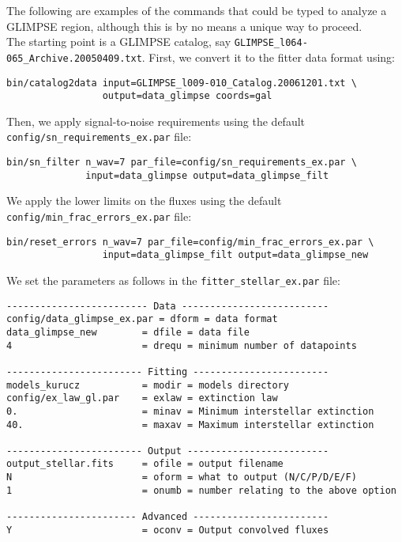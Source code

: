 \documentclass[letterpaper,11pt]{report}
\begin{document}
The following are examples of the commands that could be typed to analyze a GLIMPSE region, although this is by no means a unique way to proceed.\\

The starting point is a GLIMPSE catalog, say \texttt{GLIMPSE\_l064-065\_Archive.20050409.txt}. First, we convert it to the fitter data format using:

\begin{verbatim}
bin/catalog2data input=GLIMPSE_l009-010_Catalog.20061201.txt \
                 output=data_glimpse coords=gal\end{verbatim}

Then, we apply signal-to-noise requirements using the default \texttt{config/sn\_requirements\_ex.par} file:

\begin{verbatim}
bin/sn_filter n_wav=7 par_file=config/sn_requirements_ex.par \
              input=data_glimpse output=data_glimpse_filt
\end{verbatim}

We apply the lower limits on the fluxes using the default \texttt{config/min\_frac\_errors\_ex.par} file:

\begin{verbatim}
bin/reset_errors n_wav=7 par_file=config/min_frac_errors_ex.par \
                 input=data_glimpse_filt output=data_glimpse_new
\end{verbatim}

We set the parameters as follows in the \texttt{fitter\_stellar\_ex.par} file:

\begin{scriptsize}
\begin{Verbatim}[frame=single,framesep=5mm]
------------------------- Data --------------------------
config/data_glimpse_ex.par = dform = data format
data_glimpse_new        = dfile = data file
4                       = drequ = minimum number of datapoints

------------------------ Fitting ------------------------
models_kurucz           = modir = models directory
config/ex_law_gl.par    = exlaw = extinction law
0.                      = minav = Minimum interstellar extinction
40.                     = maxav = Maximum interstellar extinction

------------------------ Output -------------------------
output_stellar.fits     = ofile = output filename
N                       = oform = what to output (N/C/P/D/E/F)
1                       = onumb = number relating to the above option

----------------------- Advanced ------------------------
Y                       = oconv = Output convolved fluxes
\end{Verbatim}
\end{scriptsize}
\end{document}
